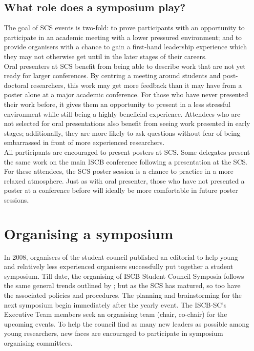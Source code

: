 \documentclass[]{article}%
\begin{document}
	\subsection*{What role does a symposium play?}
	
	The goal of SCS events is two-fold: to prove participants with an opportunity to participate in an academic meeting with a lower pressured environment; and to provide organisers with a chance to gain a first-hand leadership experience which they may not otherwise get until in the later stages of their careers.\\
	
	Oral presenters at SCS benefit from being able to describe work that are not yet ready for larger conferences. By centring a meeting around students and post-doctoral researchers, this work may get more feedback than it may have from a poster alone at a major academic conference.  For those who have never presented their work before, it gives them an opportunity to present in a less stressful environment while still being a highly beneficial experience.  Attendees who are not selected for oral presentations also benefit from seeing work presented in early stages; additionally, they are more likely to ask questions without fear of being embarrassed in front of more experienced researchers. \\
	
	All participants are encouraged to present posters at SCS. Some delegates present the same work on the main ISCB conference following a presentation at the SCS. For these attendees, the SCS poster session is a chance to practice in a more relaxed atmosphere. Just as with oral presenter, those who have not presented a poster at a conference before will ideally be more comfortable in future poster sessions. \\
	
	
	\section*{Organising a symposium}
	
	In 2008, organisers of the student council published an editorial to help young and relatively less experienced organisers successfully put together a student symposium. Till date, the organising of ISCB Student Council Symposia follows the same general trends outlined by \citet{corpas2008}; but as the SCS has matured, so too have the associated policies and procedures. The planning and brainstorming for the next symposium begin immediately after the yearly event. The ISCB-SC's Executive Team members seek an organising team (chair, co-chair) for the upcoming events. To help the council find as many new leaders as possible among young researchers, new faces are encouraged to participate in symposium organising committees.\\
	
\end{document}
